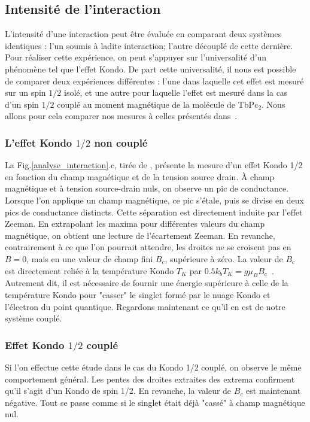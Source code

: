 \subsection{Intensité de l'interaction}
L'intensité d'une interaction peut être évaluée en comparant deux systèmes identiques : l'un soumis à ladite interaction; l'autre découplé de cette dernière. Pour réaliser cette expérience, on peut s'appuyer sur l'universalité d'un phénomène tel que l'effet Kondo. De part cette universalité, il nous est possible de comparer deux expériences différentes : l'une dans laquelle cet effet est mesuré sur un spin $1/2$ isolé, et une autre pour laquelle l'effet est mesuré dans la cas d'un spin $1/2$ couplé au moment magnétique de la molécule de TbPc$_2$. Nous allons pour cela comparer nos mesures à celles présentés dans~\cite{Roch2009}.

\subsubsection{L'effet Kondo $1/2$ non couplé}
La Fig.\ref{analyse_interaction}.c, tirée de \cite{Roch2009}, présente la mesure d'un effet Kondo 1/2 en fonction du champ magnétique et de la tension source drain. \`A champ magnétique et  à tension source-drain nuls, on observe un pic de conductance. Lorsque l'on applique un champ magnétique, ce pic s'étale, puis se divise en deux pics de conductance distincts. Cette séparation est directement induite par l'effet Zeeman. En extrapolant les maxima pour différentes valeurs du champ magnétique, on obtient une lecture de l'écartement Zeeman. En revanche, contrairement à ce que l'on pourrait attendre, les droites ne se croisent pas en $B=0$, mais en une valeur de champ fini $B_c$, supérieure à zéro. La valeur de $B_c$ est directement reliée à la température Kondo $T_K$ par $0.5 k_bT_K = g \mu_B B_c$~\cite{Roch2009}. Autrement dit, il est nécessaire de fournir une énergie supérieure à celle de la température Kondo pour "casser" le singlet formé par le nuage Kondo et l'électron du point quantique. Regardons maintenant ce qu'il en est de notre système couplé.

\subsubsection{Effet Kondo $1/2$ couplé} 
Si l'on effectue cette étude dans le cas du Kondo 1/2 couplé, on observe le même comportement général. Les pentes des droites extraites des extrema confirment qu'il s'agit d'un Kondo de spin 1/2. En revanche, la valeur de $B_c$ est maintenant négative. Tout se passe comme si le singlet était déjà "cassé" à champ magnétique nul. 

